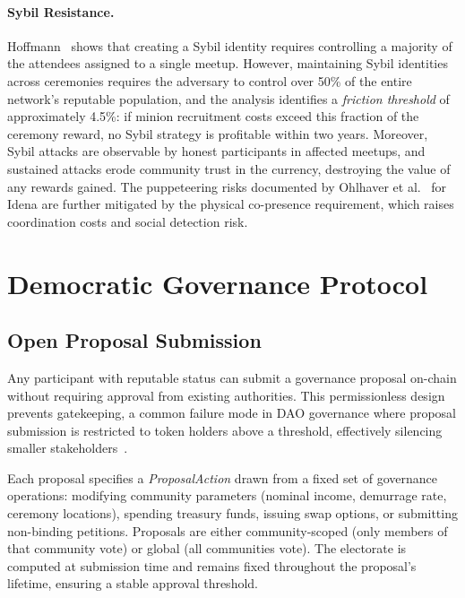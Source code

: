 \documentclass{svproc}
\begin{document}
\paragraph{Sybil Resistance.}
Hoffmann~\cite{hoffmann2021security} shows that creating a Sybil identity requires controlling a majority of the attendees assigned to a single meetup. However, maintaining Sybil identities across ceremonies requires the adversary to control over 50\% of the entire network's reputable population, and the analysis identifies a \emph{friction threshold} of approximately 4.5\%: if minion recruitment costs exceed this fraction of the ceremony reward, no Sybil strategy is profitable within two years. Moreover, Sybil attacks are observable by honest participants in affected meetups, and sustained attacks erode community trust in the currency, destroying the value of any rewards gained. The puppeteering risks documented by Ohlhaver et al.~\cite{ohlhaver2024proof} for Idena are further mitigated by the physical co-presence requirement, which raises coordination costs and social detection risk.

\section{Democratic Governance Protocol}
\label{sec:governance}

\subsection{Open Proposal Submission}
\label{sec:proposals}

Any participant with reputable status can submit a governance proposal on-chain without requiring approval from existing authorities. This permissionless design prevents gatekeeping, a common failure mode in DAO governance where proposal submission is restricted to token holders above a threshold, effectively silencing smaller stakeholders~\cite{schneider2024governable}.

Each proposal specifies a \emph{ProposalAction} drawn from a fixed set of governance operations: modifying community parameters (nominal income, demurrage rate, ceremony locations), spending treasury funds, issuing swap options, or submitting non-binding petitions. Proposals are either community-scoped (only members of that community vote) or global (all communities vote). The electorate is computed at submission time and remains fixed throughout the proposal's lifetime, ensuring a stable approval threshold.
\end{document}
